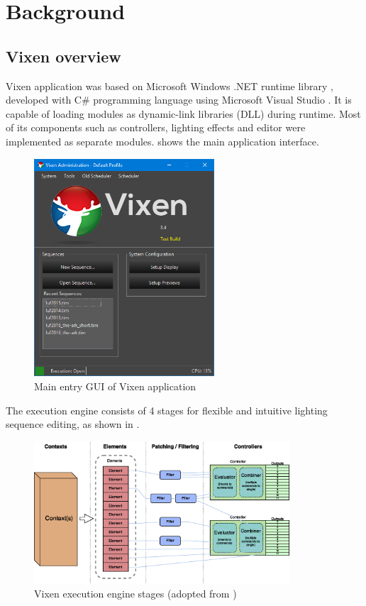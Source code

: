 \chapter{Background}
\renewcommand{\baselinestretch}{\mystretch}
\label{chap:BG}

\section{Vixen overview}

 Vixen application was based on Microsoft Windows .NET runtime library \cite{platt2002introducing}, developed with C\# programming language \cite{hejlsberg2003c} using Microsoft Visual Studio \cite{msvs}. It is capable of loading modules as dynamic-link libraries (DLL) during runtime. Most of its components such as controllers, lighting effects and editor were implemented as separate modules.  shows the main application interface.

\begin{figure}[!t]
  \centering
  \includegraphics[width=0.6\textwidth]{Figs//vixen_main.png}
  \caption{\footnotesize Main entry GUI of Vixen application}
  \label{fig:vixen-main}
\end{figure}

The execution engine consists of 4 stages for flexible and intuitive lighting sequence editing, as shown in .

\begin{figure}[!t]
  \centering
  \includegraphics[width=0.85\textwidth]{Figs//V3-Engine-1.eps}
  \caption{\footnotesize Vixen execution engine stages (adopted from \cite{vixen})}
  \label{fig:stages}
\end{figure}

